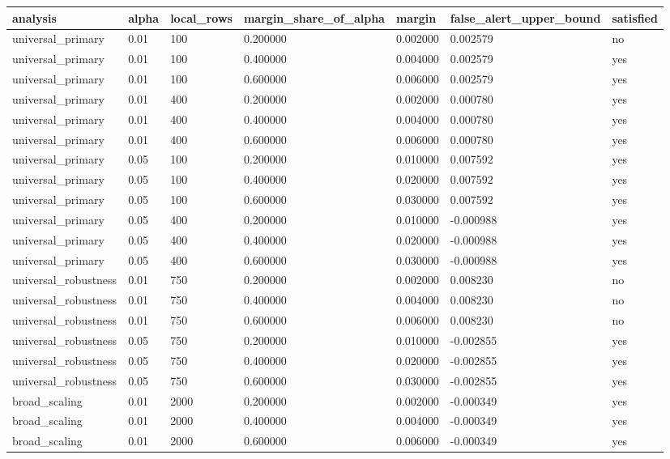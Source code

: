 \begin{tabular}{lllllll}
\toprule
analysis & alpha & local\_rows & margin\_share\_of\_alpha & margin & false\_alert\_upper\_bound & satisfied \\
\midrule
universal\_primary & 0.01 & 100 & 0.200000 & 0.002000 & 0.002579 & no \\
universal\_primary & 0.01 & 100 & 0.400000 & 0.004000 & 0.002579 & yes \\
universal\_primary & 0.01 & 100 & 0.600000 & 0.006000 & 0.002579 & yes \\
universal\_primary & 0.01 & 400 & 0.200000 & 0.002000 & 0.000780 & yes \\
universal\_primary & 0.01 & 400 & 0.400000 & 0.004000 & 0.000780 & yes \\
universal\_primary & 0.01 & 400 & 0.600000 & 0.006000 & 0.000780 & yes \\
universal\_primary & 0.05 & 100 & 0.200000 & 0.010000 & 0.007592 & yes \\
universal\_primary & 0.05 & 100 & 0.400000 & 0.020000 & 0.007592 & yes \\
universal\_primary & 0.05 & 100 & 0.600000 & 0.030000 & 0.007592 & yes \\
universal\_primary & 0.05 & 400 & 0.200000 & 0.010000 & -0.000988 & yes \\
universal\_primary & 0.05 & 400 & 0.400000 & 0.020000 & -0.000988 & yes \\
universal\_primary & 0.05 & 400 & 0.600000 & 0.030000 & -0.000988 & yes \\
universal\_robustness & 0.01 & 750 & 0.200000 & 0.002000 & 0.008230 & no \\
universal\_robustness & 0.01 & 750 & 0.400000 & 0.004000 & 0.008230 & no \\
universal\_robustness & 0.01 & 750 & 0.600000 & 0.006000 & 0.008230 & no \\
universal\_robustness & 0.05 & 750 & 0.200000 & 0.010000 & -0.002855 & yes \\
universal\_robustness & 0.05 & 750 & 0.400000 & 0.020000 & -0.002855 & yes \\
universal\_robustness & 0.05 & 750 & 0.600000 & 0.030000 & -0.002855 & yes \\
broad\_scaling & 0.01 & 2000 & 0.200000 & 0.002000 & -0.000349 & yes \\
broad\_scaling & 0.01 & 2000 & 0.400000 & 0.004000 & -0.000349 & yes \\
broad\_scaling & 0.01 & 2000 & 0.600000 & 0.006000 & -0.000349 & yes \\

\end{tabular}
